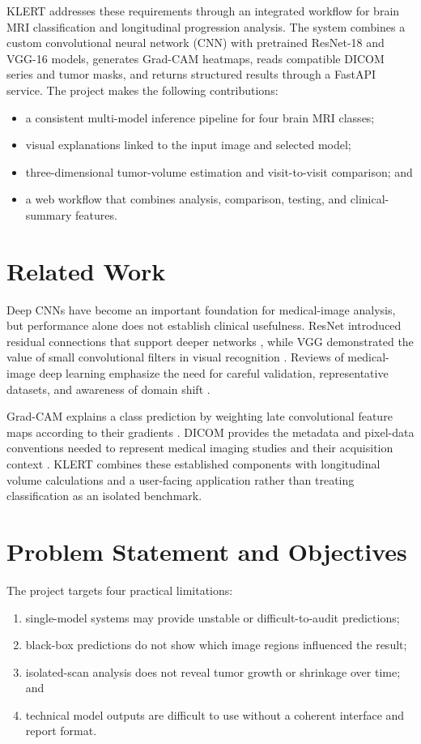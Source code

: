 \documentclass[conference]{IEEEtran}
\begin{document}
KLERT addresses these requirements through an integrated workflow for brain MRI classification and longitudinal progression analysis. The system combines a custom convolutional neural network (CNN) with pretrained ResNet-18 and VGG-16 models, generates Grad-CAM heatmaps, reads compatible DICOM series and tumor masks, and returns structured results through a FastAPI service. The project makes the following contributions:
\begin{itemize}
\item a consistent multi-model inference pipeline for four brain MRI classes;
\item visual explanations linked to the input image and selected model;
\item three-dimensional tumor-volume estimation and visit-to-visit comparison; and
\item a web workflow that combines analysis, comparison, testing, and clinical-summary features.
\end{itemize}

\section{Related Work}
Deep CNNs have become an important foundation for medical-image analysis, but performance alone does not establish clinical usefulness. ResNet introduced residual connections that support deeper networks \cite{he2016resnet}, while VGG demonstrated the value of small convolutional filters in visual recognition \cite{simonyan2015vgg}. Reviews of medical-image deep learning emphasize the need for careful validation, representative datasets, and awareness of domain shift \cite{litjens2017survey}.

Grad-CAM explains a class prediction by weighting late convolutional feature maps according to their gradients \cite{selvaraju2017gradcam}. DICOM provides the metadata and pixel-data conventions needed to represent medical imaging studies and their acquisition context \cite{dicom2024}. KLERT combines these established components with longitudinal volume calculations and a user-facing application rather than treating classification as an isolated benchmark.

\section{Problem Statement and Objectives}
The project targets four practical limitations:
\begin{enumerate}
\item single-model systems may provide unstable or difficult-to-audit predictions;
\item black-box predictions do not show which image regions influenced the result;
\item isolated-scan analysis does not reveal tumor growth or shrinkage over time; and
\item technical model outputs are difficult to use without a coherent interface and report format.
\end{enumerate}
\end{document}
